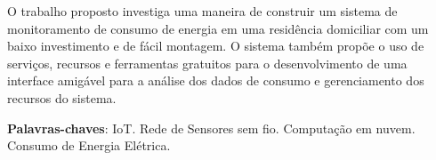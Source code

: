 \setlength{\absparsep}{18pt} %
\begin{resumo}
 O trabalho proposto investiga uma maneira de construir um sistema de monitoramento de consumo de energia em uma residência domiciliar com um baixo investimento e de fácil montagem. O sistema também propõe o uso de serviços, recursos e ferramentas gratuitos para o desenvolvimento de uma interface amigável para a análise dos dados de consumo e gerenciamento dos recursos do sistema.

 \textbf{Palavras-chaves}: IoT. Rede de Sensores sem fio. Computação em nuvem. Consumo de Energia Elétrica.
\end{resumo}
